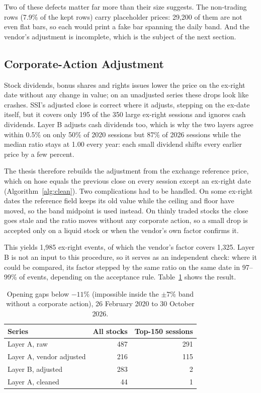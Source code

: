 Two of these defects matter far more than their size suggests. The non-trading rows (7.9\% of
the kept rows) carry placeholder prices: 29{,}200 of them are not even flat bars, so each would
print a fake bar spanning the daily band. And the vendor's adjustment is incomplete, which is
the subject of the next section.

\subsection{Corporate-Action Adjustment}
\label{sec:data-adjustment}

Stock dividends, bonus shares and rights issues lower the price on the ex-right date without
any change in value; on an unadjusted series these drops look like crashes. SSI's adjusted
close is correct where it adjusts, stepping on the ex-date itself, but it covers only 195 of the
350 large ex-right sessions and ignores cash dividends. Layer B adjusts cash dividends too,
which is why the two layers agree within 0.5\% on only 50\% of 2020 sessions but 87\% of 2026
sessions while the median ratio stays at 1.00 every year: each small dividend shifts every
earlier price by a few percent.

The thesis therefore rebuilds the adjustment from the exchange reference price, which on
\gls{hose} equals the previous close on every session except an ex-right date
(Algorithm~\ref{alg:clean}). Two complications had to be handled. On some ex-right dates the
reference field keeps its old value while the ceiling and floor have moved, so the band
midpoint is used instead. On thinly traded stocks the close goes stale and the ratio moves
without any corporate action, so a small drop is accepted only on a liquid stock or when the
vendor's own factor confirms it.

This yields 1{,}985 ex-right events, of which the vendor's factor covers 1{,}325. Layer B is not
an input to this procedure, so it serves as an independent check: where it could be compared,
its factor stepped by the same ratio on the same date in 97--99\% of events, depending on the
acceptance rule. Table~\ref{tab:data-gaps} shows the result.

\begin{table}[ht]
  \centering
  \caption{Opening gaps below $-11\%$ (impossible inside the $\pm7\%$ band without a corporate
    action), 26 February 2020 to 30 October 2026.}
  \label{tab:data-gaps}
  \begin{tabular}{lrr}
    \toprule
    Series                   & All stocks & Top-150 sessions \\
    \midrule
    Layer A, raw             & 487        & 291              \\
    Layer A, vendor adjusted & 216        & 115              \\
    Layer B, adjusted        & 283        & 2                \\
    Layer A, cleaned         & 44         & 1                \\
    \bottomrule
  \end{tabular}
\end{table}

